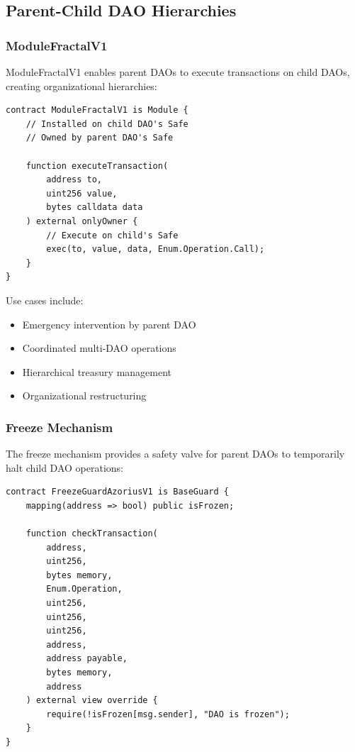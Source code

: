 \documentclass[11pt,a4paper]{article}
\begin{document}
\subsection{Parent-Child DAO Hierarchies}

\subsubsection{ModuleFractalV1}

ModuleFractalV1 enables parent DAOs to execute transactions on child DAOs, creating organizational hierarchies:

\begin{lstlisting}[caption=Parent-Child Relationship]
contract ModuleFractalV1 is Module {
    // Installed on child DAO's Safe
    // Owned by parent DAO's Safe

    function executeTransaction(
        address to,
        uint256 value,
        bytes calldata data
    ) external onlyOwner {
        // Execute on child's Safe
        exec(to, value, data, Enum.Operation.Call);
    }
}
\end{lstlisting}

Use cases include:
\begin{itemize}
    \item Emergency intervention by parent DAO
    \item Coordinated multi-DAO operations
    \item Hierarchical treasury management
    \item Organizational restructuring
\end{itemize}

\subsubsection{Freeze Mechanism}

The freeze mechanism provides a safety valve for parent DAOs to temporarily halt child DAO operations:

\begin{lstlisting}[caption=Freeze Guard Architecture]
contract FreezeGuardAzoriusV1 is BaseGuard {
    mapping(address => bool) public isFrozen;

    function checkTransaction(
        address,
        uint256,
        bytes memory,
        Enum.Operation,
        uint256,
        uint256,
        uint256,
        address,
        address payable,
        bytes memory,
        address
    ) external view override {
        require(!isFrozen[msg.sender], "DAO is frozen");
    }
}
\end{lstlisting}
\end{document}
